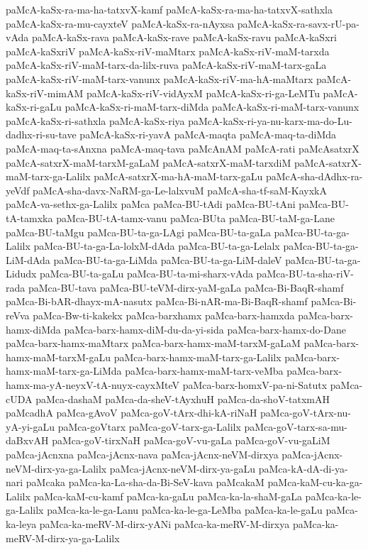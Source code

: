 {paMcA-kaSx-ra-ma-ha-tatxvX-kamf
paMcA-kaSx-ra-ma-ha-tatxvX-sathxla
paMcA-kaSx-ra-mu-cayxteV
paMcA-kaSx-ra-nAyxsa
paMcA-kaSx-ra-savx-rU-pa-vAda
paMcA-kaSx-rava
paMcA-kaSx-rave
paMcA-kaSx-ravu
paMcA-kaSxri
paMcA-kaSxriV
paMcA-kaSx-riV-maMtarx
paMcA-kaSx-riV-maM-tarxda
paMcA-kaSx-riV-maM-tarx-da-lilx-ruva
paMcA-kaSx-riV-maM-tarx-gaLa
paMcA-kaSx-riV-maM-tarx-vanunx
paMcA-kaSx-riV-ma-hA-maMtarx
paMcA-kaSx-riV-mimAM
paMcA-kaSx-riV-vidAyxM
paMcA-kaSx-ri-ga-LeMTu
paMcA-kaSx-ri-gaLu
paMcA-kaSx-ri-maM-tarx-diMda
paMcA-kaSx-ri-maM-tarx-vanunx
paMcA-kaSx-ri-sathxla
paMcA-kaSx-riya
paMcA-kaSx-ri-ya-nu-karx-ma-do-Lu-dadhx-ri-su-tave
paMcA-kaSx-ri-yavA
paMcA-maqta
paMcA-maq-ta-diMda
paMcA-maq-ta-sAnxna
paMcA-maq-tava
paMcAnAM
paMcA-rati
paMcAsatxrX
paMcA-satxrX-maM-tarxM-gaLaM
paMcA-satxrX-maM-tarxdiM
paMcA-satxrX-maM-tarx-ga-Lalilx
paMcA-satxrX-ma-hA-maM-tarx-gaLu
paMcA-sha-dAdhx-ra-yeVdf
paMcA-sha-davx-NaRM-ga-Le-lalxvuM
paMcA-sha-tf-saM-KayxkA
paMcA-va-sethx-ga-Lalilx
paMca
paMca-BU-tAdi
paMca-BU-tAni
paMca-BU-tA-tamxka
paMca-BU-tA-tamx-vanu
paMca-BUta
paMca-BU-taM-ga-Lane
paMca-BU-taMgu
paMca-BU-ta-ga-LAgi
paMca-BU-ta-gaLa
paMca-BU-ta-ga-Lalilx
paMca-BU-ta-ga-La-lolxM-dAda
paMca-BU-ta-ga-Lelalx
paMca-BU-ta-ga-LiM-dAda
paMca-BU-ta-ga-LiMda
paMca-BU-ta-ga-LiM-daleV
paMca-BU-ta-ga-Lidudx
paMca-BU-ta-gaLu
paMca-BU-ta-mi-sharx-vAda
paMca-BU-ta-sha-riV-rada
paMca-BU-tava
paMca-BU-teVM-dirx-yaM-gaLa
paMca-Bi-BaqR-shamf
paMca-Bi-bAR-dhayx-mA-nasutx
paMca-Bi-nAR-ma-Bi-BaqR-shamf
paMca-Bi-reVva
paMca-Bw-ti-kakekx
paMca-barxhamx
paMca-barx-hamxda
paMca-barx-hamx-diMda
paMca-barx-hamx-diM-du-da-yi-sida
paMca-barx-hamx-do-Dane
paMca-barx-hamx-maMtarx
paMca-barx-hamx-maM-tarxM-gaLaM
paMca-barx-hamx-maM-tarxM-gaLu
paMca-barx-hamx-maM-tarx-ga-Lalilx
paMca-barx-hamx-maM-tarx-ga-LiMda
paMca-barx-hamx-maM-tarx-veMba
paMca-barx-hamx-ma-yA-neyxV-tA-nuyx-cayxMteV
paMca-barx-homxV-pa-ni-Satutx
paMca-cUDA
paMca-dashaM
paMca-da-sheV-tAyxhuH
paMca-da-shoV-tatxmAH
paMcadhA
paMca-gAvoV
paMca-goV-tArx-dhi-kA-riNaH
paMca-goV-tArx-nu-yA-yi-gaLu
paMca-goVtarx
paMca-goV-tarx-ga-Lalilx
paMca-goV-tarx-sa-mu-daBxvAH
paMca-goV-tirxNaH
paMca-goV-vu-gaLa
paMca-goV-vu-gaLiM
paMca-jAcnxna
paMca-jAcnx-nava
paMca-jAcnx-neVM-dirxya
paMca-jAcnx-neVM-dirx-ya-ga-Lalilx
paMca-jAcnx-neVM-dirx-ya-gaLu
paMca-kA-dA-di-ya-nari
paMcaka
paMca-ka-La-sha-da-Bi-SeV-kava
paMcakaM
paMca-kaM-cu-ka-ga-Lalilx
paMca-kaM-cu-kamf
paMca-ka-gaLu
paMca-ka-la-shaM-gaLa
paMca-ka-le-ga-Lalilx
paMca-ka-le-ga-Lanu
paMca-ka-le-ga-LeMba
paMca-ka-le-gaLu
paMca-ka-leya
paMca-ka-meRV-M-dirx-yANi
paMca-ka-meRV-M-dirxya
paMca-ka-meRV-M-dirx-ya-ga-Lalilx
}
